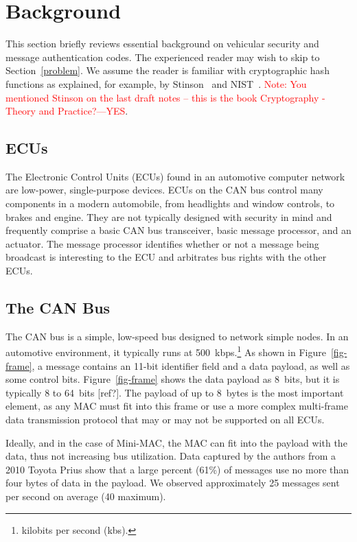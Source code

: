 \section{Background}
\label{background}

This section briefly reviews essential background on vehicular security and message authentication codes. 
The experienced reader may wish to skip to Section~\ref{problem}. 
We assume the reader is familiar with cryptographic hash functions as explained, for example, by Stinson~\cite{Sti} and NIST~\cite{FIPS-180-4}.
\textcolor{red}{Note: You mentioned Stinson on the last draft notes -- this is the book Cryptography - Theory and Practice?---YES}.

\subsection{ECUs}
The Electronic Control Units (ECUs) found in an automotive computer network are low-power, single-purpose devices. ECUs on the CAN bus control many components in a modern automobile, from headlights and window controls, to brakes and engine. They are not typically designed with security in mind and frequently comprise a basic CAN bus transceiver, basic message processor, and an actuator. The message processor identifies whether or not a message being broadcast is interesting to the ECU and arbitrates bus rights with the other ECUs. 

\subsection{The CAN Bus}
The CAN bus is a simple, low-speed bus designed to network simple nodes. In an automotive environment, 
it typically runs at 500~kbps.\footnote{kilobits per second (kbs).} As shown in Figure~\ref{fig-frame}, 
a message contains an 11-bit identifier field and 
a data payload, as well as some control bits. Figure~\ref{fig-frame} shows the data payload as 8~bits, but
it is typically 8 to 64~bits [ref?].
The payload of up to 8~bytes is the most important element, as any MAC must fit into this frame or use a more complex multi-frame data transmission protocol that may or may not be supported on all ECUs. 

Ideally, and in the case of Mini-MAC, the MAC can fit into the payload with the data, thus not increasing bus utilization. Data captured by the authors from a 2010 Toyota Prius show that a large percent (61\%) of messages use no more than four bytes of data in the payload.
We observed approximately 25 messages sent per second on average (40 maximum).

